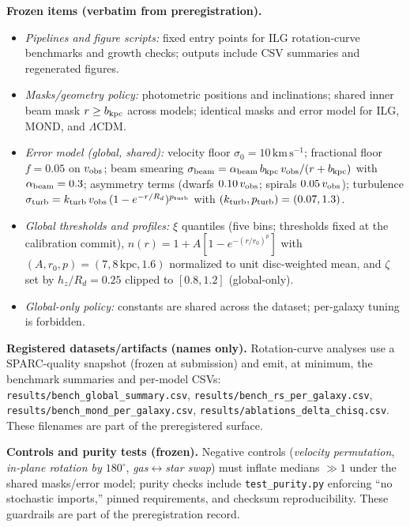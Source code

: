 \documentclass[11pt]{article}
\begin{document}
\medskip
\noindent\textbf{Frozen items (verbatim from preregistration).}
\begin{itemize}
  \item \emph{Pipelines and figure scripts:} fixed entry points for ILG rotation-curve benchmarks and growth checks; outputs include CSV summaries and regenerated figures. 
  \item \emph{Masks/geometry policy:} photometric positions and inclinations; shared inner beam mask $r \ge b_{\rm kpc}$ across models; identical masks and error model for ILG, MOND, and $\Lambda$CDM. 
  \item \emph{Error model (global, shared):} velocity floor $\sigma_0=10\,\mathrm{km\,s^{-1}}$; fractional floor $f=0.05$ on $v_{\rm obs}$; beam smearing $\sigma_{\rm beam}=\alpha_{\rm beam}\,b_{\rm kpc}\,v_{\rm obs}/(r+b_{\rm kpc})$ with $\alpha_{\rm beam}=0.3$; asymmetry terms (dwarfs $0.10\,v_{\rm obs}$; spirals $0.05\,v_{\rm obs}$); turbulence $\sigma_{\rm turb}=k_{\rm turb}\,v_{\rm obs}\,(1-e^{-r/R_d})^{p_{\rm turb}}$ with $(k_{\rm turb},p_{\rm turb})=(0.07,1.3)$. 
  \item \emph{Global thresholds and profiles:} $\xi$ quantiles (five bins; thresholds fixed at the calibration commit), $n(r)=1+A[1-e^{-(r/r_0)^p}]$ with $(A,r_0,p)=(7,8\,\mathrm{kpc},1.6)$ normalized to unit disc-weighted mean, and $\zeta$ set by $h_z/R_d=0.25$ clipped to $[0.8,1.2]$ (global-only). 
  \item \emph{Global-only policy:} constants are shared across the dataset; per-galaxy tuning is forbidden. 
\end{itemize}

\noindent\textbf{Registered datasets/artifacts (names only).} Rotation-curve analyses use a SPARC-quality snapshot (frozen at submission) and emit, at minimum, the benchmark summaries and per-model CSVs: \texttt{results/bench\_global\_summary.csv}, \texttt{results/bench\_rs\_per\_galaxy.csv}, \texttt{results/bench\_mond\_per\_galaxy.csv}, \texttt{results/ablations\_delta\_chisq.csv}. These filenames are part of the preregistered surface. 

\medskip
\noindent\textbf{Controls and purity tests (frozen).} Negative controls (\textit{velocity permutation}, \textit{in-plane rotation by $180^\circ$}, \textit{gas$\leftrightarrow$star swap}) must inflate medians $\gg 1$ under the shared masks/error model; purity checks include \texttt{test\_purity.py} enforcing ``no stochastic imports,'' pinned requirements, and checksum reproducibility. These guardrails are part of the preregistration record. 
\end{document}
